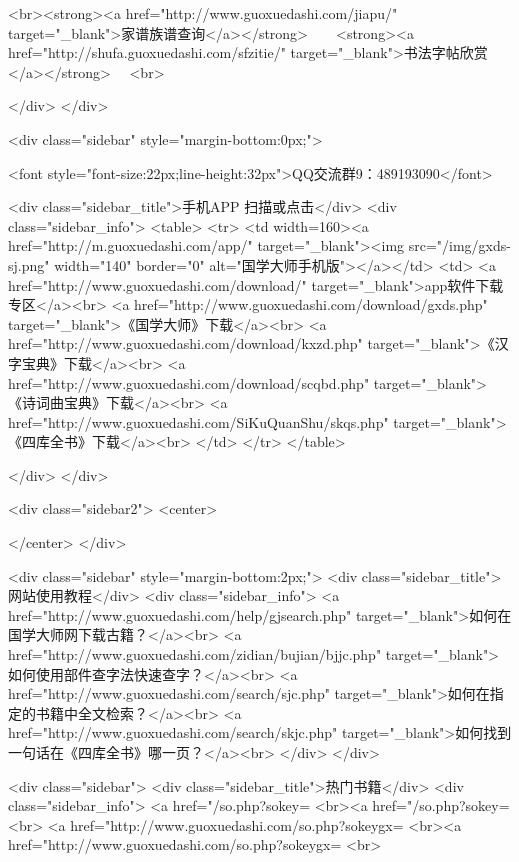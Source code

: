 <br><strong><a href="http://www.guoxuedashi.com/jiapu/" target="_blank">家谱族谱查询</a></strong>　　<strong><a href="http://shufa.guoxuedashi.com/sfzitie/" target="_blank">书法字帖欣赏</a></strong>　
<br>

</div>
</div>


<div class="sidebar" style="margin-bottom:0px;">

<font style="font-size:22px;line-height:32px">QQ交流群9：489193090</font>


<div class="sidebar_title">手机APP 扫描或点击</div>
<div class="sidebar_info">
<table>
<tr>
	<td width=160><a href="http://m.guoxuedashi.com/app/" target="_blank"><img src="/img/gxds-sj.png" width="140"  border="0" alt="国学大师手机版"></a></td>
	<td>
<a href="http://www.guoxuedashi.com/download/" target="_blank">app软件下载专区</a><br>
<a href="http://www.guoxuedashi.com/download/gxds.php" target="_blank">《国学大师》下载</a><br>
<a href="http://www.guoxuedashi.com/download/kxzd.php" target="_blank">《汉字宝典》下载</a><br>
<a href="http://www.guoxuedashi.com/download/scqbd.php" target="_blank">《诗词曲宝典》下载</a><br>
<a href="http://www.guoxuedashi.com/SiKuQuanShu/skqs.php" target="_blank">《四库全书》下载</a><br>
</td>
</tr>
</table>

</div>
</div>


<div class="sidebar2">
<center>


</center>
</div>

<div class="sidebar"  style="margin-bottom:2px;">
<div class="sidebar_title">网站使用教程</div>
<div class="sidebar_info">
<a href="http://www.guoxuedashi.com/help/gjsearch.php" target="_blank">如何在国学大师网下载古籍？</a><br>
<a href="http://www.guoxuedashi.com/zidian/bujian/bjjc.php" target="_blank">如何使用部件查字法快速查字？</a><br>
<a href="http://www.guoxuedashi.com/search/sjc.php" target="_blank">如何在指定的书籍中全文检索？</a><br>
<a href="http://www.guoxuedashi.com/search/skjc.php" target="_blank">如何找到一句话在《四库全书》哪一页？</a><br>
</div>
</div>


<div class="sidebar">
<div class="sidebar_title">热门书籍</div>
<div class="sidebar_info">
<a href="/so.php?sokey=%
<br><a href="/so.php?sokey=%
<br>
<a href="http://www.guoxuedashi.com/so.php?sokeygx=%
<br><a href="http://www.guoxuedashi.com/so.php?sokeygx=%
<br>

